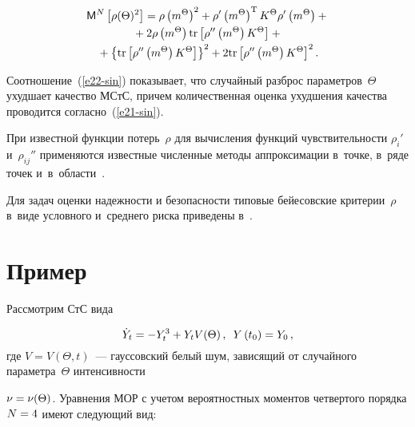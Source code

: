 \begin{multicols}{2}
\vspace*{-12pt}

\noindent
\begin{multline*}
{\sf M}^N \left[ \rho(\Theta)^2\right] =
\rho \left(m^\Theta\right)^2 + \rho' \left(m^\Theta\right)^{\mathrm{T}} K^\Theta \rho'
\left(m^\Theta\right) + {}\\[-1pt]
{}+2 \rho \left(m^\Theta\right) \mathrm{tr} \left[
\rho'' \left(m^\Theta\right) K^\Theta\right] +{}\\[-1pt]
{}+ \left\{ \mathrm{tr} \left[ \rho '' \left(m^\Theta\right) K^\Theta\right]
\right\}^2 + 2 \mathrm{tr} \left[ \rho'' \left(m^\Theta\right) K^\Theta\right]^2.
\end{multline*}

Соотношение~(\ref{e22-sin}) показывает, что случайный разброс параметров~$\Theta$
ухудшает качество МСтС, причем количественная оценка ухудшения качества
проводится согласно~(\ref{e21-sin}).

При известной функции потерь~$\rho$ для вычисления функций
чувствительности  $\rho_i'$ и~$\rho_{ij}''$ применяются известные численные
методы аппроксимации в~точке, в~ряде точек и~в~об\-ласти~\cite{17-sin}.

Для задач оценки надежности и безопасности типовые бейесовские критерии~$\rho$
в~виде условного и~среднего риска приведены в~\cite{17-sin, 18-sin}.

\vspace*{-8pt}

\section{Пример}

\vspace*{-2pt}

Рассмотрим СтС вида~\cite{1-sin, 2-sin}

\vspace*{2pt}

\noindent
\begin{equation*}
\dot Y_t =-Y_t^3 + Y_t V(\Theta)\,,\enskip Y\left(t_0\right)=Y_0\,,
\end{equation*}
где $V=V(\Theta,t)$~--- гауссовский белый шум, зависящий от
случайного параметра~$\Theta$ интенсивности\linebreak\vspace*{-12pt}

\columnbreak

\noindent
 $\nu \hm= \nu (\Theta)$.
Уравнения МОР с учетом вероятностных моментов четвертого порядка
$N\hm=4$ имеют следующий вид:


\end{multicols}
